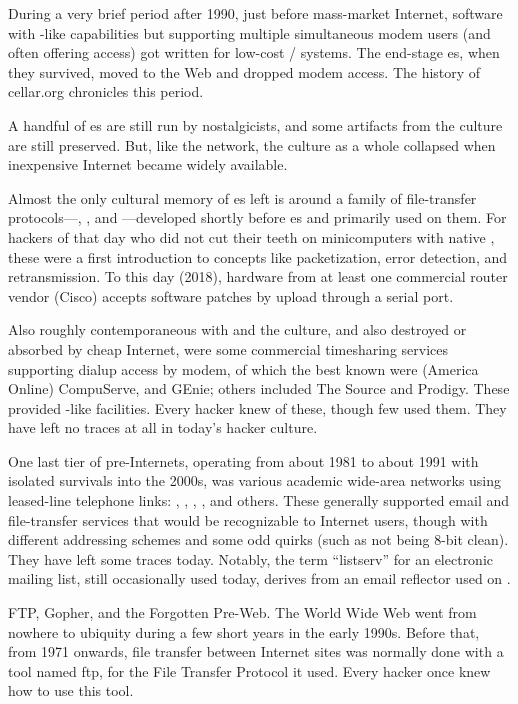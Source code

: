 During a very brief period after 1990, just before mass-market Internet,
software with -like capabilities but supporting multiple simultaneous modem
users (and often offering  access) got written for low-cost \UNIX/ systems.
The end-stage es, when they survived, moved to the Web and dropped modem
access. The history of cellar.org chronicles this period.

A handful of es are still run by nostalgicists, and some artifacts from the
culture are still preserved. But, like the  network, the  culture as a
whole collapsed when inexpensive Internet became widely available.

Almost the only cultural memory of es left is around a family of
file-transfer protocols---, , and ---developed shortly before
es and primarily used on them. For hackers of that day who did not cut their
teeth on minicomputers with native , these were a first introduction to
concepts like packetization, error detection, and retransmission. To this day
(2018), hardware from at least one commercial router vendor (Cisco) accepts
software patches by  upload through a serial port.

Also roughly contemporaneous with  and the  culture, and also
destroyed or absorbed by cheap Internet, were some commercial timesharing
services supporting dialup access by modem, of which the best known were 
(America Online) CompuServe, and GEnie; others included The Source and Prodigy.
These provided -like facilities. Every hacker knew of these, though few used
them. They have left no traces at all in today's hacker culture.

One last tier of pre-Internets, operating from about 1981 to about 1991 with
isolated survivals into the 2000s, was various academic wide-area networks
using leased-line telephone links: , , , , and others.
These generally supported email and file-transfer services that would be
recognizable to Internet users, though with different addressing schemes and
some odd quirks (such as not being 8-bit clean). They have left some traces
today. Notably, the term ``listserv'' for an electronic mailing list, still
occasionally used today, derives from an email reflector used on .

\sect FTP, Gopher, and the Forgotten Pre-Web.
The World Wide Web went from nowhere to ubiquity during a few short years in
the early 1990s. Before that, from 1971 onwards, file transfer between Internet
sites was normally done with a tool named ftp, for the File Transfer Protocol
it used. Every hacker once knew how to use this tool.

